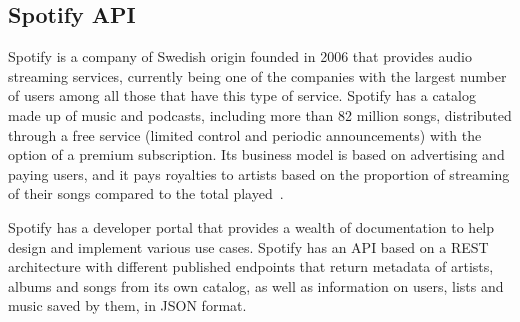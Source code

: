 \subsection{Spotify API}
\nonzeroparskip Spotify is a company of Swedish origin founded in 2006 that provides audio streaming services, currently being one of the companies with the largest number of users among all those that have this type of service. Spotify has a catalog made up of music and podcasts, including more than 82 million songs, distributed through a free service (limited control and periodic announcements) with the option of a premium subscription. Its business model is based on advertising and paying users, and it pays royalties to artists based on the proportion of streaming of their songs compared to the total played~\cite{wikipedia_spotify}.

\nonzeroparskip Spotify has a developer portal that provides a wealth of documentation to help design and implement various use cases. Spotify has an API based on a REST architecture with different published endpoints that return metadata of artists, albums and songs from its own catalog, as well as information on users, lists and music saved by them, in JSON format\cite{spotify_dev}.

